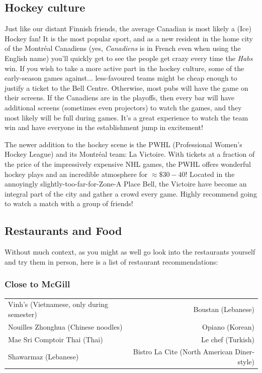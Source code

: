 \subsection*{Hockey culture}
Just like our distant Finnish friends, the average Canadian is most likely a (Ice) Hockey fan! It is the most popular sport, and as a new resident in the home city of the Montréal Canadiens (yes, \textit{Canadiens} is in French even when using the English name) you'll quickly get to see the people get crazy every time the \textit{Habs} win. If you wish to take a more active part in the hockey culture, some of the early-season games against... less-favoured teams might be cheap enough to justify a ticket to the Bell Centre. Otherwise, most pubs will have the game on their screens. If the Canadiens are in the playoffs, then every bar will have additional screens (sometimes even projectors) to watch the games, and they most likely will be full during games. It's a great experience to watch the team win and have everyone in the establishment jump in excitement!

The newer addition to the hockey scene is the PWHL (Professional Women's Hockey League) and its Montréal team: La Victoire. With tickets at a fraction of the price of the impressively expensive NHL games, the PWHL offers wonderful hockey plays and an incredible atmosphere for $\approx \$ 30-40$! Located in the annoyingly slightly-too-far-for-Zone-A Place Bell, the Victoire have become an integral part of the city and gather a crowd every game. Highly recommend going to watch a match with a group of friends! 



\subsection{Restaurants and Food}

Without much context, as you might as well go look into the restaurants yourself and try them in person, here is a list of restaurant recommendations:

\subsubsection{Close to McGill}
\begin{table}[H]
    \centering
    \begin{tabular}{lr}
    \hline
        Vinh's (Vietnamese, only during semester) &  Boustan (Lebanese)\\
        Nouilles Zhonghua (Chinese noodles) & Opiano (Korean)\\
        Mae Sri Comptoir Thai (Thai) & Le chef (Turkish) \\
        Shawarmaz (Lebanese) & Bistro La Cite (North American Diner-style)\\
        \hline
    \end{tabular}
\end{table}


